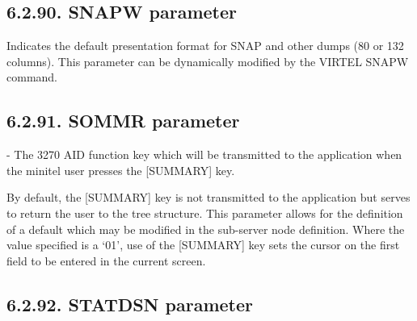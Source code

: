 \documentclass[letterpaper,10pt,english]{sphinxmanual}
\begin{document}
\subsection{6.2.90. SNAPW parameter}
\label{\detokenize{Installation_Guide:snapw-parameter}}
\begin{sphinxVerbatim}[commandchars=\\\{\}]
 
\end{sphinxVerbatim}

Indicates the default presentation format for SNAP and other dumps (80 or 132 columns). This parameter can be dynamically modified by the VIRTEL SNAPW command.


\subsection{6.2.91. SOMMR parameter}
\label{\detokenize{Installation_Guide:sommr-parameter}}
\begin{sphinxVerbatim}[commandchars=\\\{\}]
 
\end{sphinxVerbatim}

 - The 3270 AID function key which will be transmitted to the application when the minitel user presses the {[}SUMMARY{]} key.

By default, the {[}SUMMARY{]} key is not transmitted to the application but serves to return the user to the tree structure. This parameter allows for the definition of a default which may be modified in the sub-server node definition. Where the value specified is a ‘01’, use of the {[}SUMMARY{]} key sets the cursor on the first field to be entered in the current screen.


\subsection{6.2.92. STATDSN parameter}
\label{\detokenize{Installation_Guide:statdsn-parameter}}
\begin{sphinxVerbatim}[commandchars=\\\{\}]
 
\end{sphinxVerbatim}
\end{document}
